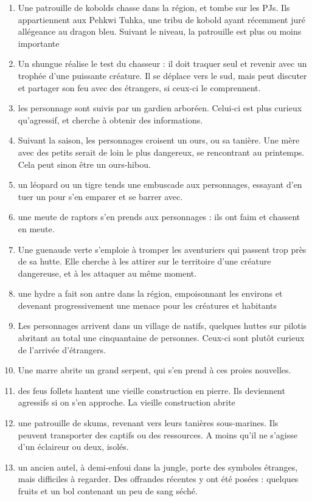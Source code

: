 \documentclass[10pt,a4paper]{book}
\begin{document}
\begin{enumerate}
\item Une patrouille de kobolds chasse dans la région, et tombe sur les PJs. Ils appartiennent aux Pehkwi Tuhka, une tribu de kobold ayant récemment juré allégeance au dragon bleu. Suivant le niveau, la patrouille est plus ou moins importante
\item Un shungue réalise le test du chasseur : il doit traquer seul et revenir avec un trophée d'une puissante créature. Il se déplace vers le sud, mais peut discuter et partager son feu avec des étrangers, si ceux-ci le comprennent.
\item les personnage sont suivis par un gardien arboréen. Celui-ci est plus curieux qu'agressif, et cherche à obtenir des informations.
\item Suivant la saison, les personnages croisent un ours, ou sa tanière. Une mère avec des petits serait de loin le plus dangereux, se rencontrant au printemps. Cela peut sinon être un ours-hibou.
\item un léopard ou un tigre tends une embuscade aux personnages, essayant d'en tuer un pour s'en emparer et se barrer avec.
\item une meute de raptors s'en prends aux personnages : ils ont faim et chassent en meute.
\item Une guenaude verte s'emploie à tromper les aventuriers qui passent trop près de sa hutte. Elle cherche à les attirer sur le territoire d'une créature dangereuse, et à les attaquer au même moment.
\item une hydre a fait son antre dans la région, empoisonnant les environs et devenant progressivement une menace pour les créatures et habitants
\item Les personnages arrivent dans un village de natifs, quelques huttes sur pilotis abritant au total une cinquantaine de personnes. Ceux-ci sont plutôt curieux de l'arrivée d'étrangers.
\item Une marre abrite un grand serpent, qui s'en prend à ces proies nouvelles.
\item des feus follets hantent une vieille construction en pierre. Ils deviennent agressifs si on s'en approche. La vieille construction abrite 
\item une patrouille de skums, revenant vers leurs tanières sous-marines. Ils peuvent transporter des captifs ou des ressources. A moins qu'il ne s'agisse d'un éclaireur ou deux, isolés.
\item un ancien autel, à demi-enfoui dans la jungle, porte des symboles étranges, mais difficiles à regarder. Des offrandes récentes y ont été posées : quelques fruits et un bol contenant un peu de sang séché.

\end{enumerate}
\end{document}
